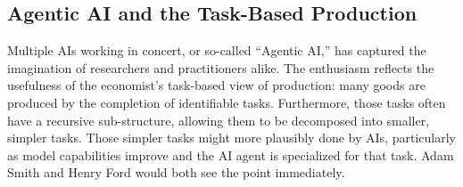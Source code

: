 \documentclass{article}
\theoremstyle{plain}
\theoremstyle{plain}
\begin{document}


\subsection{Agentic AI and the Task-Based Production}
Multiple AIs working in concert, or so-called ``Agentic AI,'' has captured the imagination of researchers and practitioners alike.
The enthusiasm reflects the usefulness of the economist's task-based view of production: many goods are produced by the completion of identifiable tasks.
Furthermore, those tasks often have a recursive sub-structure, allowing them to be decomposed into smaller, simpler tasks.
Those simpler tasks might more plausibly done by AIs, particularly as model capabilities improve and the AI agent is specialized for that task. 
Adam Smith and Henry Ford would both see the point immediately. 
\end{document}
